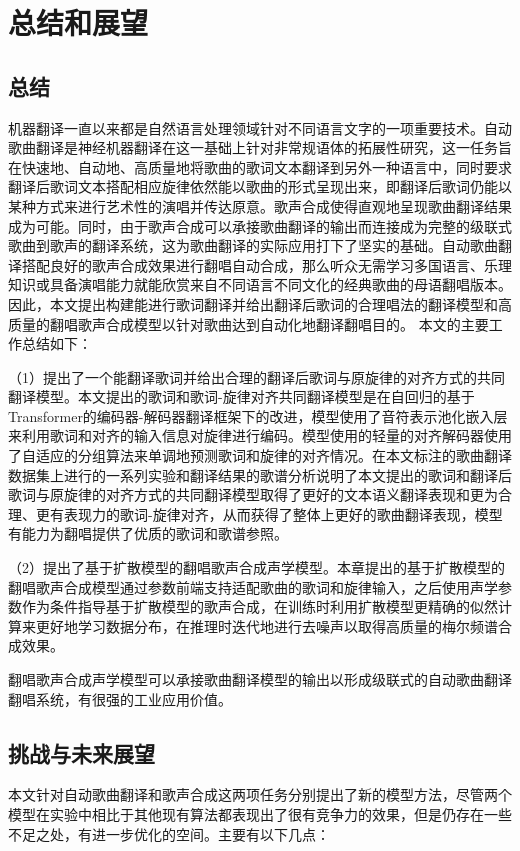 



% 
\chapter{总结和展望}
\section{总结}
机器翻译一直以来都是自然语言处理领域针对不同语言文字的一项重要技术。自动歌曲翻译是神经机器翻译在这一基础上针对非常规语体的拓展性研究，这一任务旨在快速地、自动地、高质量地将歌曲的歌词文本翻译到另外一种语言中，同时要求翻译后歌词文本搭配相应旋律依然能以歌曲的形式呈现出来，即翻译后歌词仍能以某种方式来进行艺术性的演唱并传达原意。歌声合成使得直观地呈现歌曲翻译结果成为可能。同时，由于歌声合成可以承接歌曲翻译的输出而连接成为完整的级联式歌曲到歌声的翻译系统，这为歌曲翻译的实际应用打下了坚实的基础。自动歌曲翻译搭配良好的歌声合成效果进行翻唱自动合成，那么听众无需学习多国语言、乐理知识或具备演唱能力就能欣赏来自不同语言不同文化的经典歌曲的母语翻唱版本。
因此，本文提出构建能进行歌词翻译并给出翻译后歌词的合理唱法的翻译模型和高质量的翻唱歌声合成模型以针对歌曲达到自动化地翻译翻唱目的。
本文的主要工作总结如下：

（1）提出了一个能翻译歌词并给出合理的翻译后歌词与原旋律的对齐方式的共同翻译模型。本文提出的歌词和歌词-旋律对齐共同翻译模型是在自回归的基于Transformer的编码器-解码器翻译框架下的改进，模型使用了音符表示池化嵌入层来利用歌词和对齐的输入信息对旋律进行编码。模型使用的轻量的对齐解码器使用了自适应的分组算法来单调地预测歌词和旋律的对齐情况。在本文标注的歌曲翻译数据集上进行的一系列实验和翻译结果的歌谱分析说明了本文提出的歌词和翻译后歌词与原旋律的对齐方式的共同翻译模型取得了更好的文本语义翻译表现和更为合理、更有表现力的歌词-旋律对齐，从而获得了整体上更好的歌曲翻译表现，模型有能力为翻唱提供了优质的歌词和歌谱参照。

（2）提出了基于扩散模型的翻唱歌声合成声学模型。本章提出的基于扩散模型的翻唱歌声合成模型通过参数前端支持适配歌曲的歌词和旋律输入，之后使用声学参数作为条件指导基于扩散模型的歌声合成，在训练时利用扩散模型更精确的似然计算来更好地学习数据分布，在推理时迭代地进行去噪声以取得高质量的梅尔频谱合成效果。

翻唱歌声合成声学模型可以承接歌曲翻译模型的输出以形成级联式的自动歌曲翻译翻唱系统，有很强的工业应用价值。
\section{挑战与未来展望}
本文针对自动歌曲翻译和歌声合成这两项任务分别提出了新的模型方法，尽管两个模型在实验中相比于其他现有算法都表现出了很有竞争力的效果，但是仍存在一些不足之处，有进一步优化的空间。主要有以下几点：

